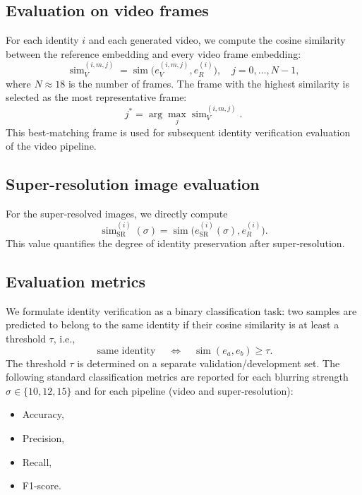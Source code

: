 \documentclass{ieeeaccess}
\begin{document}
\subsection{Evaluation on video frames}
For each identity $i$ and each generated video, we compute the cosine similarity between the reference embedding and every video frame embedding:
\begin{equation}
    \operatorname{sim}_V^{(i,m,j)} = \operatorname{sim}\bigl(e_V^{(i,m,j)}, e_R^{(i)}\bigr), \quad j = 0, \dots, N-1,
\end{equation}
where $N \approx 18$ is the number of frames. The frame with the highest similarity is selected as the most representative frame:
\begin{equation}
    j^* = \arg\max_j \operatorname{sim}_V^{(i,m,j)}.
\end{equation}
This best‑matching frame is used for subsequent identity verification evaluation of the video pipeline.

\subsection{Super-resolution image evaluation}
For the super‑resolved images, we directly compute
\begin{equation}
    \operatorname{sim}_{\text{SR}}^{(i)}(\sigma) = \operatorname{sim}\bigl(e_{\text{SR}}^{(i)}(\sigma), e_R^{(i)}\bigr).
\end{equation}
This value quantifies the degree of identity preservation after super‑resolution.

\subsection{Evaluation metrics}
We formulate identity verification as a binary classification task: two samples are predicted to belong to the same identity if their cosine similarity is at least a threshold $\tau$, i.e.,
\begin{equation}
    \operatorname{same\ identity} \quad \iff \quad \operatorname{sim}(e_a, e_b) \geq \tau.
\end{equation}
The threshold $\tau$ is determined on a separate validation/development set. The following standard classification metrics are reported for each blurring strength $\sigma \in \{10, 12, 15\}$ and for each pipeline (video and super‑resolution):

\begin{itemize}
    \item Accuracy,
    \item Precision,
    \item Recall,
    \item F1-score.
\end{itemize}
\end{document}
